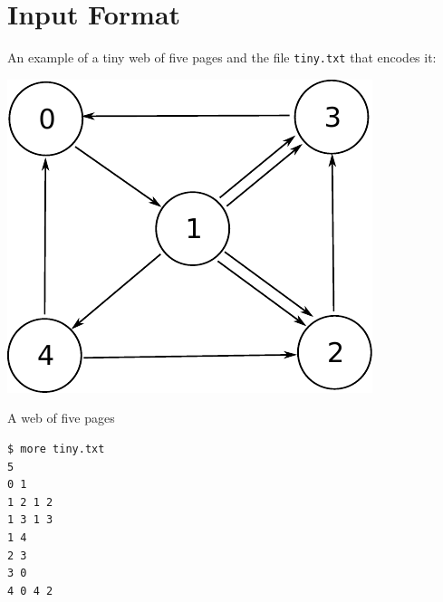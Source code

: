 \documentclass[8pt,a4paper,compress,handout]{beamer}
\begin{document}
\section{Input Format}
\begin{frame}[fragile]
An example of a tiny web of five pages and the file \lstinline{tiny.txt} that encodes it:

\begin{center}
\includegraphics[scale=0.6]{figures/tiny_www.pdf}

\smallskip

\tiny A web of five pages
\end{center}

\begin{lstlisting}[language={}]
$ more tiny.txt
5
0 1
1 2 1 2
1 3 1 3
1 4
2 3
3 0
4 0 4 2
\end{lstlisting}
\end{frame}
\end{document}
